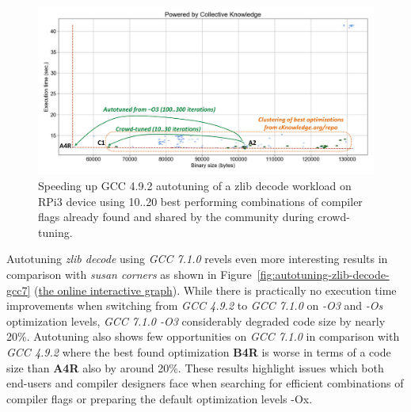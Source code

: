    \begin{figure}[!htbp]
     \centering
      \includegraphics[width=5.2in]
      {ck-assets/749a8998a2e29db5-cropped.pdf} %
      \vspace{0.1in}
      \vspace{0.1in}
     \caption{
      Speeding up GCC 4.9.2 autotuning of a zlib decode workload on RPi3 device using 
      10..20 best performing combinations of compiler flags already found and shared by the community
      during crowd-tuning.
     }
     \label{fig:autotuning-zlib-decode-gcc4-reactions}
   \end{figure}

Autotuning \textit{zlib decode} using \textit{GCC 7.1.0} revels even more interesting results
in comparison with \textit{susan corners} as shown in Figure~\ref{fig:autotuning-zlib-decode-gcc7} 
(\href{http://cknowledge.org/repo/web.php?wcid=graph:2bf38fd88a0e3ba1&subgraph=rpi3-autotuning-zlib-decode-gcc7-interactive}{the online interactive graph}).
%
While there is practically no execution time improvements when switching from \textit{GCC 4.9.2} to \textit{GCC 7.1.0}
on \textit{-O3} and \textit{-Os} optimization levels, \textit{GCC 7.1.0 -O3} considerably degraded code size by nearly 20\%.
%
Autotuning also shows few opportunities on \textit{GCC 7.1.0} in comparison with \textit{GCC 4.9.2}
where the best found optimization \textbf{B4R} is worse in terms of a code size than \textbf{A4R} also by around 20\%.
%
These results highlight issues which both end-users and compiler designers face
when searching for efficient combinations of compiler flags or preparing the 
default optimization levels -Ox.

